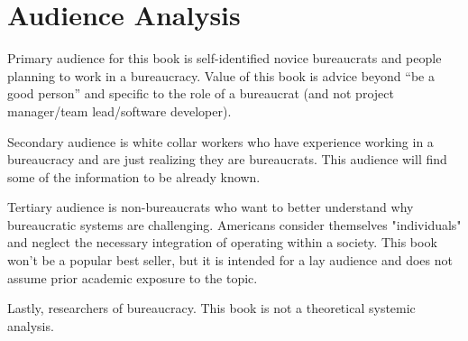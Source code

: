 \section{Audience Analysis}

Primary audience for this book is self-identified novice bureaucrats and people planning to work in a bureaucracy. Value of this book is advice beyond ``be a good person'' and specific to the role of a bureaucrat (and not project manager/team lead/software developer). 

Secondary audience is white collar workers who have experience working in a bureaucracy and are just realizing they are bureaucrats. This audience will find some of the information to be already known. 

Tertiary audience is non-bureaucrats who want to better understand why bureaucratic systems are challenging. Americans consider themselves "individuals" and neglect the necessary integration of operating within a society. This book won't be a popular best seller, but it is intended for a lay audience and does not assume prior academic exposure to the topic.

Lastly, researchers of bureaucracy. This book is not a theoretical systemic analysis. 